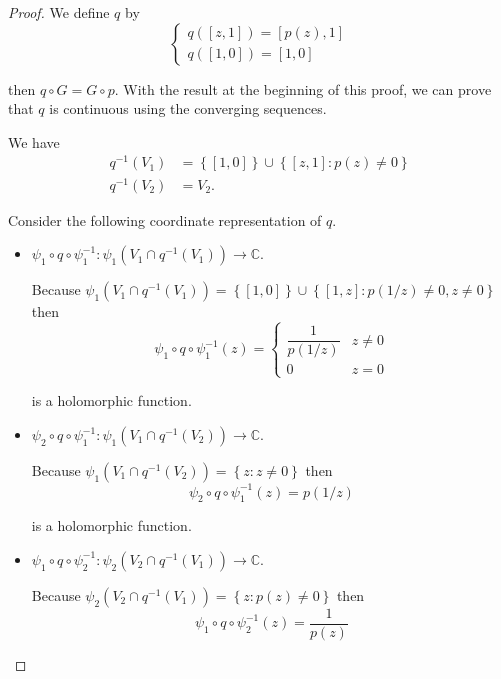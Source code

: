 \begin{proof}
    We define \( q \) by
    \[
        \begin{cases}
            q([z, 1]) = [p(z), 1] \\
            q([1, 0]) = [1, 0]
        \end{cases}
    \]

    then \( q \circ G = G \circ p \). With the result at the beginning of this proof, we can prove that \( q \) is continuous using the converging sequences.

    We have
    \begingroup
    \allowdisplaybreaks%
    \begin{align*}
        q^{-1}(V_{1}) & = \left\{ [1, 0] \right\} \cup \left\{ [z, 1]: p(z) \ne 0 \right\} \\
        q^{-1}(V_{2}) & = V_{2}.
    \end{align*}
    \endgroup

    Consider the following coordinate representation of \( q \).
    \begin{itemize}[itemsep=0pt]
        \item \( \psi_{1} \circ q \circ \psi_{1}^{-1}: \psi_{1}(V_{1} \cap q^{-1}(V_{1})) \to \mathbb{C} \).

              Because \( \psi_{1}(V_{1} \cap q^{-1}(V_{1})) = \left\{ [1, 0] \right\} \cup \left\{ [1, z]: p(1/z) \ne 0, z \ne 0 \right\} \) then
              \[
                  \psi_{1} \circ q \circ \psi_{1}^{-1}(z) = \begin{cases} \dfrac{1}{p(1/z)} & z \ne 0 \\ 0 & z = 0 \end{cases}
              \]

              is a holomorphic function.
        \item \( \psi_{2} \circ q \circ \psi_{1}^{-1}: \psi_{1}(V_{1} \cap q^{-1}(V_{2})) \to \mathbb{C} \).

              Because \( \psi_{1}(V_{1} \cap q^{-1}(V_{2})) = \left\{ z: z \ne 0 \right\} \) then
              \[
                  \psi_{2} \circ q \circ \psi_{1}^{-1}(z) = p(1/z)
              \]

              is a holomorphic function.
        \item \( \psi_{1} \circ q \circ \psi_{2}^{-1}: \psi_{2}(V_{2} \cap q^{-1}(V_{1})) \to \mathbb{C} \).

              Because \( \psi_{2}(V_{2} \cap q^{-1}(V_{1})) = \left\{ z: p(z) \ne 0 \right\} \) then
              \[
                  \psi_{1} \circ q \circ \psi_{2}^{-1}(z) = \dfrac{1}{p(z)}
              \]


\end{itemize}
\end{proof}
